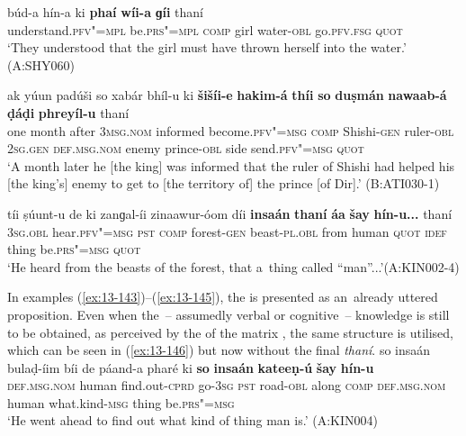 \begin{exe}
\ex
\label{ex:13-143}
\gll \label{bkm:Ref190835538}búd-a hín-a ki \textbf{phaí} \textbf{wíi-a} \textbf{ ɡíi} thaní \\
understand.\textsc{pfv"=mpl} be.\textsc{prs"=mpl} \textsc{comp} girl water-\textsc{obl} go.\textsc{pfv.fsg} \textsc{quot} \\
\glt `They understood that the girl must have thrown herself into the water.' (A:SHY060)

\ex
\label{ex:13-144}
\gll ak yúun padúši so xabár bhíl-u  ki \textbf{šišíi-e} \textbf{hakim-á} \textbf{thíi} \textbf{so} \textbf{duṣmán} \textbf{nawaab-á} \textbf{ḍáḍi} \textbf{phreyíl-u} thaní \\
one month after \textsc{3msg.nom} informed become.\textsc{pfv"=msg}  \textsc{comp} Shishi-\textsc{gen} ruler-\textsc{obl } \textsc{2sg.gen} \textsc{def.msg.nom} enemy prince-\textsc{obl} side send.\textsc{pfv"=msg} \textsc{quot}  \\
\glt `A month later he [the king] was informed that the ruler of Shishi had helped his [the king's] enemy to get to [the territory of] the prince [of Dir].' (B:ATI030-1)

\ex
\label{ex:13-145}
\gll \label{bkm:Ref190835565}tíi ṣúunt-u de ki zanɡal-íi zinaawur-óom  díi \textbf{insaán} \textbf{thaní} \textbf{áa} \textbf{šay} \textbf{hín-u\textbf{...}} thaní \\
\textsc{3sg.obl} hear.\textsc{pfv"=msg} \textsc{pst} \textsc{comp} forest-\textsc{gen} beast-\textsc{pl.obl}  from human \textsc{quot} \textsc{idef} thing be.\textsc{prs"=msg} \textsc{quot} \\
\glt `He heard from the beasts of the forest, that a~thing called ``man''...'\newline (A:KIN002-4) 
\end{exe}

In examples (\ref{ex:13-143})--(\ref{ex:13-145}), the  is presented as an~already uttered proposition. Even when the~-- assumedly verbal or cognitive~-- knowledge is still to be obtained, as perceived by the  of the matrix , the same structure is utilised, which can be seen in (\ref{ex:13-146}) but now without the final \textit{thaní}. 
\ea
\label{ex:13-146}
\gll so insaán bulaḍ-íim bíi de páand-a pharé ki \textbf{so} \textbf{insaán} \textbf{kateeṇ-ú} \textbf{šay} \textbf{hín-u}\\
\textsc{def.msg.nom} human find.out-\textsc{cprd} go-\textsc{3sg} \textsc{pst} road-\textsc{obl}  along \textsc{comp} \textsc{def.msg.nom} human what.kind-\textsc{msg} thing be.\textsc{prs"=msg}\\
\glt `He went ahead to find out what kind of thing man is.' (A:KIN004) 
\z

